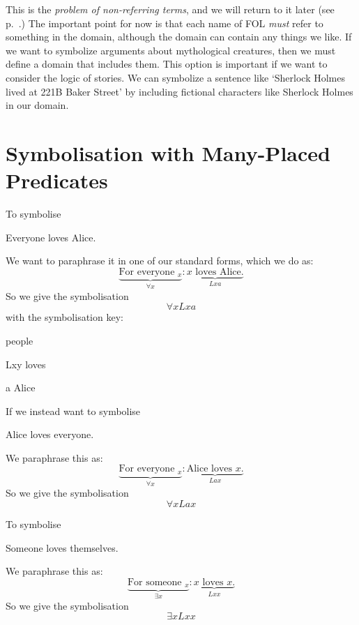 This is the \emph{problem of non-referring terms}, and we will return to it later (see p.~\pageref{subsec.defdesc}.) The important point for now is that each name of FOL \emph{must} refer to something in the domain, although the domain can contain any things we like. If we want to symbolize arguments about mythological creatures, then we must define a domain that includes them. This option is important if we want to consider the logic of stories. We can symbolize a sentence like `Sherlock Holmes lived at 221B Baker Street' by including fictional characters like Sherlock Holmes in our domain.



\section{Symbolisation with Many-Placed Predicates}



To symbolise 
\begin{earg}
	\item[\ex{loveseveryone1}] Everyone loves Alice.
\end{earg}
We want to paraphrase it in one of our standard forms, which we do as:
\begin{equation*}
\underbrace{\text{For everyone $_x$}}_{\forall x}: \underbrace{\text{$x$ loves Alice.}}_{Lxa}
\end{equation*}
So we give the symbolisation $$\forall x Lxa$$ with the symbolisation key:
\begin{ekey}
\item[\text{domain}] people
\item[Lxy] loves 
\item[a] Alice
\end{ekey}
If we instead want to symbolise 
\begin{earg}
	\item[\ex{loveseveryone2}] Alice loves everyone.
\end{earg}
We paraphrase this as:
\begin{equation*}
\underbrace{\text{For everyone $_x$}}_{\forall x}: \underbrace{\text{Alice loves $x$.}}_{Lax}
\end{equation*}
So we give the symbolisation $$\forall x Lax$$

To symbolise 
\begin{earg}
	\item[\ex{lovesesomeonethemselves}] Someone loves themselves.
\end{earg}
We paraphrase this as:
\begin{equation*}
\underbrace{\text{For someone $_x$}}_{\exists x}: \underbrace{\text{$x$ loves $x$.}}_{Lxx}
\end{equation*}
So we give the symbolisation $$\exists x Lxx$$



